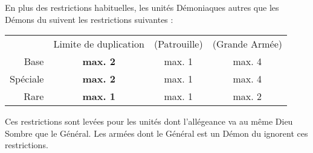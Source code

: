 \newcommand{\incineratorrule}{%
Une figurine équipée d'un \incinerator{} gagne \fireborn{}.\newline
\textbf{\artilleryweapon} de type \textbf{\flamethrower}.\newline
\range{8}, Force 4, \flamingattacks{}.
}

\newcommand{\brasscannonrule}{%
Ne peut être pris que si le Général est un \daemonofwrath{}. \newline
\textbf{\artilleryweapon} de type \textbf{\cannon}(\distance{1D6}).\newline
\range{48}, Force 10, \flamingattacks{}, \multiplewounds{\ordnance}{}, \armourpiercing{2}, \multipleshots{2D6}.\newline
Si le \bloodchariot{} ne fait que pivoter (et aucun autre mouvement), il ne subit pas de malus pour mouvement et tir.
}

\newcommand{\bloodfeastrule}{%
À chaque fois que cette figurine effectue avec succès une charge, toutes les unités amies \daemonofwrath{} engagées dans le même combat qu'elle gagnent \frenzy jusqu'à la fin de cette phase de combat.
}














\startarmywiderules

\spaceaftersection{}

En plus des restrictions habituelles, les unités Démoniaques autres que les Démons du \truechaos{} suivent les restrictions suivantes :

\vspace*{0.2cm}
\renewcommand{\arraystretch}{2}
\begin{center}\begin{tabular}{rccc}
\hline
 & Limite de duplication & (Patrouille) & (Grande Armée) \tabularnewline
 Base & \textbf{max. 2} & max. 1 & max. 4 \tabularnewline
 Spéciale & \textbf{max. 2} & max. 1 & max. 4 \tabularnewline
 Rare & \textbf{max. 1} & max. 1 & max. 2 \tabularnewline
\hline
\end{tabular}\end{center}
\renewcommand{\arraystretch}{1.2}
\vspace*{0.2cm}

Ces restrictions sont levées pour les unités dont l'allégeance va au même Dieu Sombre que le Général. Les armées dont le Général est un Démon du \truechaos{} ignorent ces restrictions.

